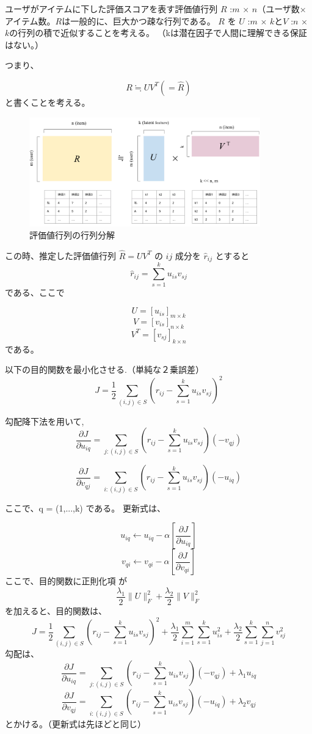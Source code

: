 \documentclass{jarticle}
\begin{document}
ユーザがアイテムに下した評価スコアを表す評価値行列 $R$ :$m$ $\times$ $n$（ユーザ数×アイテム数。$R$は一般的に、巨大かつ疎な行列である。 $R$ を $U$ :$m$ $\times$ $k$と$V$ :$n$ $\times$ $k$の行列の積で近似することを考える。
（kは潜在因子で人間に理解できる保証はない。）


つまり、

\[
 R \fallingdotseq U V^T (= \hat{R})
\]
と書くことを考える。

\begin{figure}[htbp]
  \begin{center}
  \includegraphics[width=100mm]{matrix_factorization.png}
  \caption{評価値行列の行列分解}
  \end{center}
  \end{figure}
  

この時、推定した評価値行列 $\hat{R} = UV^T$  の $ij$ 成分を $\hat{r}_{ij}$ とすると
\[
 \hat{r}_{ij} =  \sum_{s=1}^{k} u_{is} v_{sj} 
\]
である、ここで

\[
  U = [u_{is}]_{m \times k}
\]
\[
  V = [v_{is}]_{n \times k}
\]
\[
  V^T = [v_{sj}]_{k \times n}
\]
である。

\newpage

以下の目的関数を最小化させる.（単純な２乗誤差）
\[
  J = \frac{1}{2} \sum_{(i,j) \in S} (r_{ij} - \sum_{s=1}^{k} u_{is} v_{sj} )^2
\]

勾配降下法を用いて,
\[
\frac{\partial J}{\partial u_{iq}} = \sum_{j:(i,j) \in S} (r_{ij} - \sum_{s=1}^{k} u_{is} v_{sj} )(-v_{qj}) 
\]

\[
\frac{\partial J}{\partial v_{qj}} = \sum_{i:(i,j) \in S} (r_{ij} - \sum_{s=1}^{k} u_{is} v_{sj} )(-u_{iq}) 
\]

ここで、q = ({1,...,k}) である。
更新式は、

\[
  u_{iq} \longleftarrow u_{iq} - \alpha\left[\frac{\partial J}{\partial u_{iq}}\right]
\]
\[
  v_{qi} \longleftarrow v_{qi} - \alpha\left[\frac{\partial J}{\partial v_{qi}}\right]
\]
ここで、目的関数に正則化項 が
\[
  \frac{\lambda_1}{2}\|U\|^2_F + \frac{\lambda_2}{2}\|V\|^2_F
\]
を加えると、目的関数は、
\[
  J = \frac{1}{2} \sum_{(i,j) \in S} (r_{ij} - \sum_{s=1}^{k} u_{is} v_{sj} )^2 + \frac{\lambda_1}{2}\sum_{i=1}^{m}\sum_{s=1}^{k}u_{is}^2 + \frac{\lambda_2}{2}\sum_{s=1}^{k}\sum_{j=1}^{n}v_{sj}^2
\]
勾配は、
\[
\frac{\partial J}{\partial u_{iq}} = \sum_{j:(i,j) \in S} (r_{ij} - \sum_{s=1}^{k} u_{is} v_{sj} )(-v_{qj}) + \lambda_1 u_{iq}
\]
\[
\frac{\partial J}{\partial v_{qj}} = \sum_{i:(i,j) \in S} (r_{ij} - \sum_{s=1}^{k} u_{is} v_{sj} )(-u_{iq}) + \lambda_2 v_{qj}
\]
とかける。（更新式は先ほどと同じ）
\end{document}
